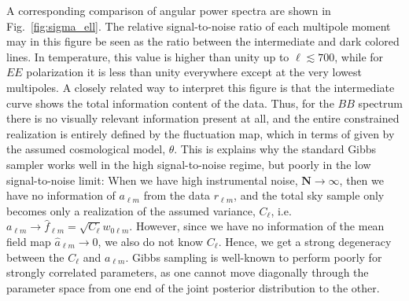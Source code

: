 \documentclass[twocolumn]{../common/aa}
\begin{document}
A corresponding comparison of angular power spectra are shown in Fig.~\ref{fig:sigma_ell}. The relative signal-to-noise ratio of each multipole moment may in this figure be seen as the ratio between the intermediate and dark colored lines. In temperature, this value is higher than unity up to $\ell\lesssim700$, while for $EE$ polarization it is less than unity everywhere except at the very lowest multipoles. A closely related way to interpret this figure is that the intermediate curve shows the total information content of the data. Thus, for the $BB$ spectrum there is no visually relevant information present at all, and the entire constrained realization is entirely defined by the fluctuation map, which in terms of given by the assumed cosmological model, $\theta$. This is explains why the standard Gibbs sampler works well in the high signal-to-noise regime, but poorly in the low signal-to-noise limit: When we have high instrumental noise, $\boldsymbol{N} \rightarrow \infty$, then we have no information of $a_{\ell m}$ from the data $r_{\ell m}$, and the total sky sample only becomes only a realization of the assumed variance, $C_{\ell}$, i.e. $a_{\ell m} \rightarrow \hat{f}_{\ell m} = \sqrt{C_{\ell}} w_{0\ell m}$. However, since we have no information of the mean field map $\hat{a}_{\ell m} \rightarrow 0$, we also do not know $C_\ell$. Hence, we get a strong degeneracy between the $C_\ell$ and $a_{\ell m}$. Gibbs sampling is well-known to perform poorly for strongly correlated parameters, as one cannot move diagonally through the parameter space from one end of the joint posterior distribution to the other. 
\end{document}
